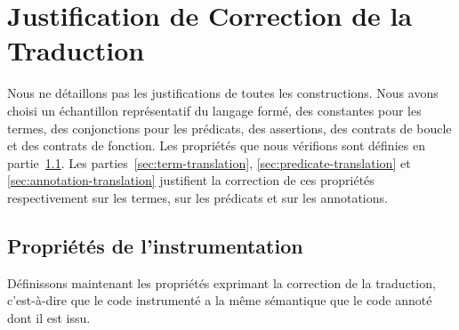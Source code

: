 

\section{Justification de Correction de la Traduction}
\label{sec:justif}


Nous ne détaillons pas les justifications de toutes les constructions.
Nous avons choisi un échantillon représentatif du langage formé, des constantes
pour les termes, des conjonctions pour les prédicats, des assertions, des
contrats de boucle et des contrats de fonction.
Les propriétés que nous vérifions sont définies en partie~\ref{sec:properties}.
Les parties~\ref{sec:term-translation}, \ref{sec:predicate-translation} et
\ref{sec:annotation-translation} justifient la correction de ces propriétés
respectivement sur les termes, sur les prédicats et sur les annotations.


\subsection{Propriétés de l'instrumentation}
\label{sec:properties}


Définissons maintenant les propriétés exprimant la correction de la traduction,
c'est-à-dire que le code instrumenté a la même sémantique que le code annoté
dont il est issu.

